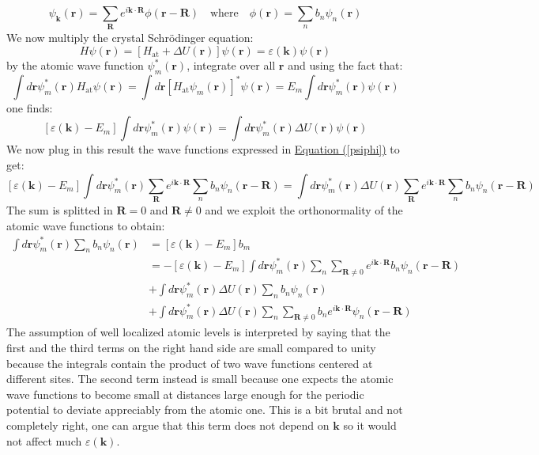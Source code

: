 \documentclass[10.75pt,a4paper,openright,bottom=2cm]{article}
\renewcommand{\Vec}[1]{\boldsymbol{#1}}
\renewcommand{\refeq}[1]{\hyperref[#1]{Equation (\ref{#1})}}
\begin{document}
\begin{equation}
\label{psiphi}
\psi_{\Vec{k}}(\Vec{r})=\sum_{\Vec{R}}e^{i\Vec{k}\cdot\Vec{R}}\phi(\Vec{r}-\Vec{R}) \quad \text{where} \quad \phi(\Vec{r})=\sum_nb_n\psi_n(\Vec{r})
\end{equation}
We now multiply the crystal Schr\"odinger equation:
\[
H\psi(\Vec{r})=[H_{\text{at}}+\Delta U(\Vec{r})]\psi(\Vec{r})=\varepsilon(\Vec{k})\psi(\Vec{r})
\]
by the atomic wave function $\psi_m^*(\Vec{r})$, integrate over all $\Vec{r}$ and using the fact that:
\[
\int d\Vec{r}\psi_m^*(\Vec{r})H_{\text{at}}\psi(\Vec{r})=\int d\Vec{r}[H_{\text{at}}\psi_m(\Vec{r})]^*\psi(\Vec{r})=E_m\int d\Vec{r}\psi_m^*(\Vec{r})\psi(\Vec{r})
\]
one finds:
\[
[\varepsilon(\Vec{k})-E_m]\int d\Vec{r}\psi_m^*(\Vec{r})\psi(\Vec{r})=\int d\Vec{r}\psi_m^*(\Vec{r})\Delta U(\Vec{r})\psi(\Vec{r})
\]
We now plug in this result the wave functions expressed in \refeq{psiphi} to get:
\[
[\varepsilon(\Vec{k})-E_m]\int d\Vec{r}\psi_m^*(\Vec{r})\sum_{\Vec{R}}e^{i\Vec{k}\cdot\Vec{R}}\sum_nb_n\psi_n(\Vec{r}-\Vec{R})=\int d\Vec{r}\psi_m^*(\Vec{r})\Delta U(\Vec{r})\sum_{\Vec{R}}e^{i\Vec{k}\cdot\Vec{R}}\sum_nb_n\psi_n(\Vec{r}-\Vec{R})
\]
The sum is splitted in $\Vec{R}=0$ and $\Vec{R}\neq0$ and we exploit the orthonormality of the atomic wave functions to obtain:
\begin{align*}
[\varepsilon(\Vec{k})-E_m]\int d\Vec{r}\psi_m^*(\Vec{r})\sum_nb_n\psi_n(\Vec{r})&=[\varepsilon(\Vec{k})-E_m]b_m\\
&=-[\varepsilon(\Vec{k})-E_m]\int d\Vec{r}\psi_m^*(\Vec{r})\sum_n\sum_{\Vec{R}\neq0}e^{i\Vec{k}\cdot\Vec{R}}b_n\psi_n(\Vec{r}-\Vec{R})\\
&+\int d\Vec{r}\psi_m^*(\Vec{r})\Delta U(\Vec{r})\sum_nb_n\psi_n(\Vec{r})\\
&+\int d\Vec{r}\psi_m^*(\Vec{r})\Delta U(\Vec{r})\sum_n\sum_{\Vec{R}\neq0}b_ne^{i\Vec{k}\cdot\Vec{R}}\psi_n(\Vec{r}-\Vec{R})
\end{align*}
The assumption of well localized atomic levels is interpreted by saying that the first and the third terms on the right hand side are small compared to unity because the integrals contain the product of two wave functions centered at different sites. The second term instead is small because one expects the atomic wave functions to become small at distances large enough for the periodic potential to deviate appreciably from the atomic one. This is a bit brutal and not completely right, one can argue that this term does not depend on $\Vec{k}$ so it would not affect much $\varepsilon(\Vec{k})$.\\
\end{document}
